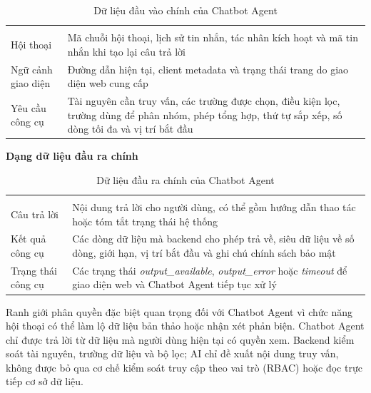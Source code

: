 \begingroup
\setlength{\tabcolsep}{2pt}
\renewcommand{\arraystretch}{1.15}
\begin{longtable}{|C{0.46\textwidth}|P{0.46\textwidth}|}
  \caption{Dữ liệu đầu vào chính của Chatbot Agent}\label{tab:ch3-chatbot-input}\\
  \hline
       &     \\ \hline
  \endfirsthead
  \hline
       &     \\ \hline
  \endhead
  Hội thoại   &   Mã chuỗi hội thoại, lịch sử tin nhắn, tác nhân kích hoạt và mã tin nhắn khi tạo lại câu trả lời \\ \hline
  Ngữ cảnh giao diện      &      Đường dẫn hiện tại, client metadata và trạng thái trang do giao diện web cung cấp \\ \hline
  Yêu cầu công cụ     &     Tài nguyên cần truy vấn, các trường được chọn, điều kiện lọc, trường dùng để phân nhóm, phép tổng hợp, thứ tự sắp xếp, số dòng tối đa và vị trí bắt đầu \\ \hline
\end{longtable}
\endgroup

\textbf{Dạng dữ liệu đầu ra chính}

\begingroup
\setlength{\tabcolsep}{2pt}
\renewcommand{\arraystretch}{1.15}
\begin{longtable}{|C{0.46\textwidth}|P{0.46\textwidth}|}
  \caption{Dữ liệu đầu ra chính của Chatbot Agent}\label{tab:ch3-chatbot-output}\\
  \hline
       &     \\ \hline
  \endfirsthead
  \hline
       &     \\ \hline
  \endhead
  Câu trả lời   &   Nội dung trả lời cho người dùng, có thể gồm hướng dẫn thao tác hoặc tóm tắt trạng thái hệ thống \\ \hline
  Kết quả công cụ      &      Các dòng dữ liệu mà backend cho phép trả về, siêu dữ liệu về số dòng, giới hạn, vị trí bắt đầu và ghi chú chính sách bảo mật \\ \hline
  Trạng thái công cụ     &     Các trạng thái \textit{output\_available}, \textit{output\_error} hoặc \textit{timeout} để giao diện web và Chatbot Agent tiếp tục xử lý \\ \hline
\end{longtable}
\endgroup

Ranh giới phân quyền đặc biệt quan trọng đối với Chatbot Agent vì chức năng hội thoại có thể làm lộ dữ liệu bản thảo hoặc nhận xét phản biện. Chatbot Agent chỉ được trả lời từ dữ liệu mà người dùng hiện tại có quyền xem. Backend kiểm soát tài nguyên, trường dữ liệu và bộ lọc; AI chỉ đề xuất nội dung truy vấn, không được bỏ qua cơ chế kiểm soát truy cập theo vai trò (RBAC) hoặc đọc trực tiếp cơ sở dữ liệu.

